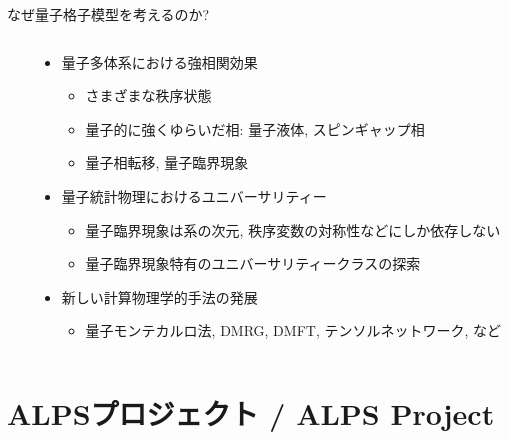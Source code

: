 \begin{frame}[t,fragile]{なぜ量子格子模型を考えるのか?}
\begin{columns}[T]
\begin{column}{.2\textwidth}
    \end{column}
    \begin{column}{.8\textwidth}
      \begin{itemize}
      \item 量子多体系における強相関効果
        \begin{itemize}
        \item さまざまな秩序状態
        \item 量子的に強くゆらいだ相: 量子液体, スピンギャップ相
        \item 量子相転移, 量子臨界現象
        \end{itemize}
      \item 量子統計物理におけるユニバーサリティー
        \begin{itemize}
        \item 量子臨界現象は系の次元, 秩序変数の対称性などにしか依存しない
        \item 量子臨界現象特有のユニバーサリティークラスの探索
        \end{itemize}
      \item 新しい計算物理学的手法の発展
        \begin{itemize}
        \item 量子モンテカルロ法, DMRG, DMFT, テンソルネットワーク, など
        \end{itemize}
      \end{itemize}
    \end{column}
  \end{columns}
\end{frame}

\section{ALPSプロジェクト / ALPS Project}

